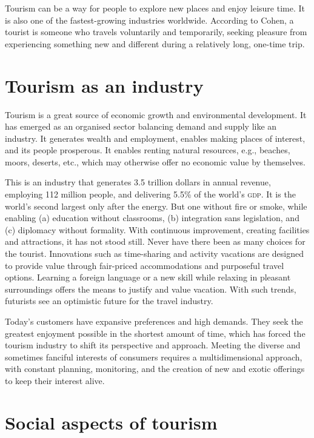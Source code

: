 Tourism can be a way for people to explore new places and enjoy leisure time. It is also one of the fastest-growing industries worldwide. According to Cohen, a tourist is someone who travels voluntarily and temporarily, seeking pleasure from experiencing something new and different during a relatively long, one-time trip.


\section{Tourism as an industry} %
\label{sec:tai}

Tourism is a great source of economic growth and environmental development. It has emerged as an organised sector balancing demand and supply like an industry. It generates wealth and employment, enables making places of interest, and its people prosperous. It enables renting natural resources, e.g., beaches, moors, deserts, etc., which may otherwise offer no economic value by themselves.

This is an industry that generates 3.5 trillion dollars in annual revenue, employing 112 million people, and delivering 5.5\% of the world's \textsc{gdp}. It is the world's second largest only after the energy. But one without fire or smoke, while enabling (a) education without classrooms, (b) integration sans legislation, and (c) diplomacy without formality. With continuous improvement, creating facilities and attractions, it has not stood still. Never have there been as many choices for the tourist. Innovations such as time-sharing and activity vacations are designed to provide value through fair-priced accommodations and purposeful travel options. Learning a foreign language or a new skill while relaxing in pleasant surroundings offers the means to justify and value vacation. With such trends, futurists see an optimistic future for the travel industry.

Today's customers have expansive preferences and high demands. They seek the greatest enjoyment possible in the shortest amount of time, which has forced the tourism industry to shift its perspective and approach. Meeting the diverse and sometimes fanciful interests of consumers requires a multidimensional approach, with constant planning, monitoring, and the creation of new and exotic offerings to keep their interest alive.


\section{Social aspects of tourism} %
\label{sec:sat}

